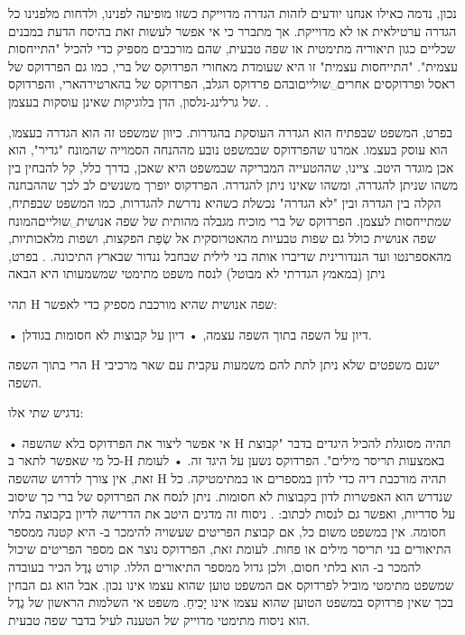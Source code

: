 נכון, נדמה כאילו אנחנו יודעים לזהות הגדרה מדוייקת כשזו מופיעה לפנינו, ולדחות מלפנינו כל הגדרה ערטילאית או לא מדוייקת. אך מתברר כי אי אפשר לעשות זאת בהיסח הדעת במבנים שכליים כגון תיאוריה מתימטית או שפה טבעית, שהם מורכבים מספיק כדי להכיל "התייחסות עצמית". "התייחסות עצמית" זו היא שעומדת מאחורי הפרדוקס של ברי, כמו גם הפרדוקס של ראסל  ופרדוקסים אחרים␣שוליים{ובהם פרדוקס הגלב, הפרדוקס של בהארטירהארי, והפרדוקס של גרלינג-נלסון, הדן בלוגיקות שאינן עוסקות בעצמן. }.

בפרט, המשפט שבפתיח הוא הגדרה העוסקת בהגדרות. כיוון שמשפט זה הוא הגדרה בעצמו, הוא עוסק בעצמו. אמרנו שהפרדוקס שבמשפט נובע מההנחה הסמוייה שהמונח "גדיר", הוא אכן מוגדר היטב. ציינו, שההטעייה המבריקה שבמשפט היא שאכן, בדרך כלל, קל להבחין בין משהו שניתן להגדרה, ומשהו שאינו ניתן להגדרה. הפרדקוס יופרך משנשים לב לכך שההבחנה הקלה בין הגדרה ובין "לא הגדרה" נכשלת כשהיא נדרשת להגדרות, כמו המשפט שבפתיח, שמתייחסות לעצמן. הפרדוקס של ברי מוכיח מגבלה מהותית של שפה אנושית␣שוליים{המונח שפה אנושית כולל גם שפות טבעיות מהאטרוסקית אל שְׂפַת הפקצות, ושפות מלאכותיות, מהאספרנטו ועד הננדורינית שדיברו אותה בני לילית שבחבל ננדור שבארץ התיכונה.
}. בפרט, ניתן (במאמץ הגדרתי לא מבוטל) לנסח משפט מתימטי שמשמעותו היא הבאה

\begin{mybox}
תהי H שפה אנושית שהיא מורכבת מספיק כדי לאפשר:
\begin{itemize}
• דיון על השפה בתוך השפה עצמה,
• דיון על קבוצות לא חסומות בגודלן.
\end{itemize}
הרי בתוך השפה H ישנם משפטים שלא ניתן לתת להם משמעות עקבית עם שאר מרכיבי השפה.
\end{mybox}

נדגיש שתי אלו:
\begin{itemize}
• אי אפשר ליצור את הפרדוקס בלא שהשפה H תהיה מסוגלת להכיל היגדים בדבר "קבוצת כל מי שאפשר לתאר ב-H באמצעות תריסר מילים". הפרדוקס נשען על היגד זה.
• לעומת זאת, אין צורך לדרוש שהשפה H תהיה מורכבת דיה כדי לדון במספרים או במתימטיקה. כל שנדרש הוא האפשרות לדון בקבוצות לא חסומות. ניתן לנסח את הפרדוקס של ברי כך שיסוב על סדריות, ואפשר גם לנסות לכתוב: . ניסוח זה מדגים היטב את הדרישה לדיון בקבוצה בלתי חסומה. אין במשפט משום כל, אם קבוצת הפריטים שעשויה להימכר ב- היא קטנה ממספר התיאורים בני תריסר מילים או פחות. לעומת זאת, הפרדוקס נוצר אם מספר הפריטים שיכול להמכר ב- הוא בלתי חסום, ולכן גדול ממספר התיאורים הללו.
קורט גֶדֶל הכיר בעובדה שמשפט מתימטי מוביל לפרדוקס אם המשפט טוען שהוא עצמו אינו נכון. אבל הוא גם הבחין בכך שאין פרדוקס במשפט הטוען שהוא עצמו אינו יָכִיחַ. משפט אי השלמות הראשון של גֶדֶל הוא ניסוח מתימטי מדוייק של הטענה לעיל בדבר שפה טבעית.
\end{itemize}

